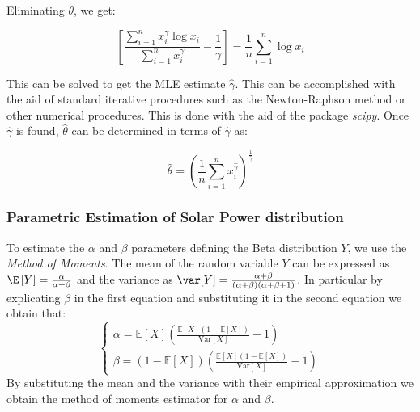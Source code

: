 \documentclass[english]{article}
\numberwithin{definition}{section}
\numberwithin{theorem}{section}
\numberwithin{problem}{section}
\begin{document}
Eliminating $\theta$, we get:

\begin{equation}
\left[ \frac{\sum_{i=1}^{n} x_i^\gamma \log x_i}{\sum_{i=1}^{n} x_i^\gamma} - \frac{1}{\gamma} \right] = \frac{1}{n} \sum_{i=1}^{n} \log x_i
\end{equation}

This can be solved to get the MLE estimate $\hat{\gamma}$. This can be accomplished with the aid of standard iterative procedures such as the Newton-Raphson method or other numerical procedures. This is done with the aid of the package \emph{scipy}. Once $\hat{\gamma}$ is found, $\hat{\theta}$ can be determined in terms of $\hat{\gamma}$ as:

\begin{equation}
\hat{\theta} = \left( \frac{1}{n} \sum_{i=1}^{n} x_i^{\hat{\gamma}} \right)^{\frac{1}{\hat{\gamma}}}
\end{equation}

\subsubsection{Parametric Estimation of Solar Power distribution}
\label{subsection: beta estim}
To estimate the \(\alpha\) and \(\beta\) parameters defining the Beta distribution \(Y\), we use the \emph{Method of Moments}. 
The mean of the random variable \(Y\) can be expressed as \(\E\left[ Y\right] = \frac{\alpha}{\alpha + \beta} \) and the variance as \(\var [Y]= \frac{\alpha + \beta}{(\alpha + \beta)(\alpha + \beta + 1)}\). In particular by explicating \(\beta\) in the first equation and substituting it in the second equation we obtain that:
\begin{equation}
\begin{cases}
\alpha = \mathbb{E}[X] \left( \frac{\mathbb{E}[X](1 - \mathbb{E}[X])}{\mathrm{Var}[X]} - 1 \right) \\
\beta = (1 - \mathbb{E}[X]) \left( \frac{\mathbb{E}[X](1 - \mathbb{E}[X])}{\mathrm{Var}[X]} - 1 \right)
\end{cases}
\end{equation}
By substituting the mean and the variance with their empirical approximation we obtain the method of moments estimator for \(\alpha\) and \(\beta\).
\end{document}
